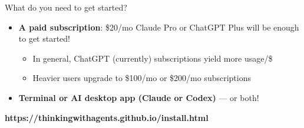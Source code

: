 \documentclass[aspectratio=169, 10pt]{beamer}
\begin{document}
\begin{frame}{What do you need to get started?}
\vskip8pt
\begin{itemize}\setlength{\itemsep}{6pt}
  \item \textbf{A paid subscription}: \$20/mo Claude Pro or ChatGPT Plus will be enough to get started!
  \vspace{-2pt}
  \begin{itemize}\setlength{\itemsep}{1pt}
    \item In general, ChatGPT (currently) subscriptions yield more usage/\$
    \item Heavier users upgrade to \$100/mo or \$200/mo subscriptions
  \end{itemize}
  \item \textbf{Terminal or AI desktop app (Claude or Codex)} --- or both!
\end{itemize}
\vskip8pt
\begin{center}\begin{tcolorbox}[accentbox, halign=center, width=8cm, top=2pt, bottom=2pt]
\small\bfseries https://thinkingwithagents.github.io/install.html
\end{tcolorbox}\end{center}
\end{frame}
\end{document}
